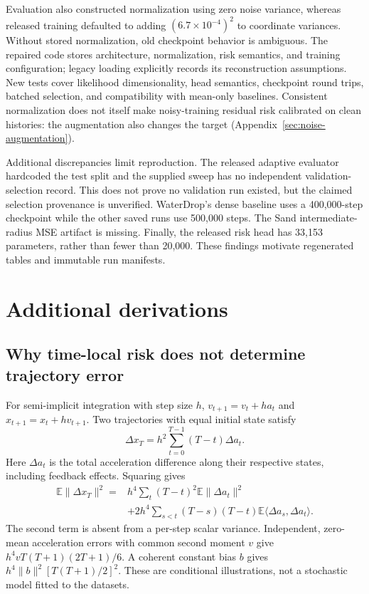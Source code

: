 Evaluation also constructed normalization using zero noise variance, whereas released training defaulted to adding $(6.7\times10^{-4})^2$ to coordinate variances. Without stored normalization, old checkpoint behavior is ambiguous. The repaired code stores architecture, normalization, risk semantics, and training configuration; legacy loading explicitly records its reconstruction assumptions. New tests cover likelihood dimensionality, head semantics, checkpoint round trips, batched selection, and compatibility with mean-only baselines. Consistent normalization does not itself make noisy-training residual risk calibrated on clean histories: the augmentation also changes the target (Appendix~\ref{sec:noise-augmentation}).

Additional discrepancies limit reproduction. The released adaptive evaluator hardcoded the test split and the supplied sweep has no independent validation-selection record. This does not prove no validation run existed, but the claimed selection provenance is unverified. WaterDrop's dense baseline uses a 400,000-step checkpoint while the other saved runs use 500,000 steps. The Sand intermediate-radius MSE artifact is missing. Finally, the released risk head has 33,153 parameters, rather than fewer than 20,000. These findings motivate regenerated tables and immutable run manifests.


\section{Additional derivations}
\subsection{Why time-local risk does not determine trajectory error}
For semi-implicit integration with step size $h$,
$v_{t+1}=v_t+ha_t$ and $x_{t+1}=x_t+hv_{t+1}$.
Two trajectories with equal initial state satisfy
\begin{equation}
 \Delta x_T=h^2\sum_{t=0}^{T-1}(T-t)\Delta a_t.
\end{equation}
Here $\Delta a_t$ is the total acceleration difference along their respective states, including feedback effects. Squaring gives
\begin{align}
 \mathbb E\|\Delta x_T\|^2
 ={}&h^4\sum_t(T-t)^2\mathbb E\|\Delta a_t\|^2\nonumber\\
 &+2h^4\sum_{s<t}(T-s)(T-t)
       \mathbb E\langle\Delta a_s,\Delta a_t\rangle.
\end{align}
The second term is absent from a per-step scalar variance. Independent, zero-mean acceleration errors with common second moment $v$ give $h^4vT(T+1)(2T+1)/6$. A coherent constant bias $b$ gives $h^4\|b\|^2[T(T+1)/2]^2$. These are conditional illustrations, not a stochastic model fitted to the datasets.


